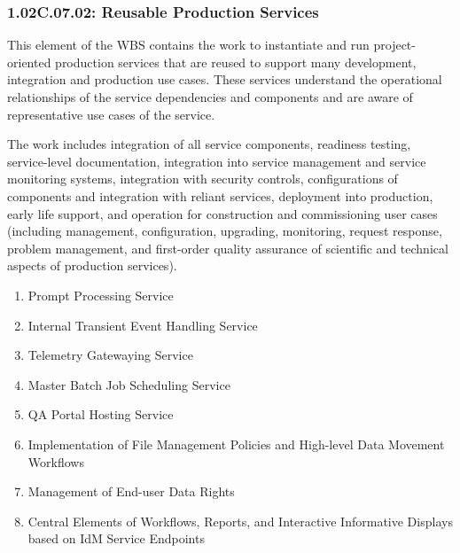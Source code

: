 \subsubsection*{1.02C.07.02: Reusable Production Services}

This element of the WBS contains the work to instantiate and run project-oriented production services that are reused to support many development, integration and production use cases.
These services understand the operational relationships of the service dependencies and components and are aware of representative use cases of the service.

The work includes integration of all service components, readiness testing, service-level documentation, integration into service management and service monitoring systems, integration with security controls, configurations of components and integration with reliant services, deployment into production, early life support, and operation for construction and commissioning user cases (including management, configuration, upgrading, monitoring, request response, problem management, and first-order quality assurance of scientific and technical aspects of production services).

\begin{enumerate}

  \item{Prompt Processing Service}
  \item{Internal Transient Event Handling Service}
  \item{Telemetry Gatewaying Service}
  \item{Master Batch Job Scheduling Service}
  \item{QA Portal Hosting Service}
  \item{Implementation of File Management Policies and High-level Data Movement Workflows}
  \item{Management of End-user Data Rights}
  \item{Central Elements of Workflows, Reports, and Interactive Informative Displays based on IdM Service Endpoints}

\end{enumerate}

